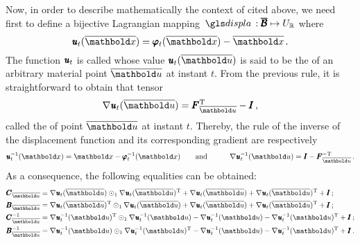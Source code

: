 Now, in order to describe mathematically the context of  cited above, we need first to define a bijective Lagrangian mapping $\map{\gloref{displa}}{\tnr{\overline{\mathcal{B}}}}{U_\real}$ where 
\begin{equation}\label{eq:displac}
 \fua{\tnr{\mathit{u}}_t}{\overline{\vto{x}}}=\fua{\tnr{\varphi}_t}{\overline{\vto{x}}} - \overline{\vto{x}}\,.
 \end{equation} 
 The function $\pmb{\mathit{u}}_t$ is called  whose value $\fua{\tnr{\mathit{u}}_t}{\overline{\vto{u}}}$ is said to be the  of an arbitrary material point $\overline{\vto{u}}$ at instant $t$. From the previous rule, it is straightforward to obtain that tensor       
\begin{equation}\label{eq:gradDispla}
\fua{\nabla\tnr{\mathit{u}}_t}{\overline{\vto{u}}}=\tnr{F}_{\overline{\vto{u}}}^{\text{T}} - \tnr{I}\,,
\end{equation} 
called the  of point $\overline{\vto{u}}$ at instant $t$. Thereby, the rule of the inverse of the displacement function and its corresponding gradient are respectively
\begin{alignat}{3} \label{eq:invDisplace}
\fua{\tnr{\mathit{u}}_t^{-1}}{\vto{x}}=\vto{x}-\fua{\tnr{\varphi}_t^{-1}}{\vto{x}}&\qquad \text{and}\qquad & \fua{\nabla\tnr{\mathit{u}}_t^{-1}}{\vto{u}}=\tnr{I}-\tnr{F}_{\overline{\vto{u}}}^{-\text{T}}\,.
\end{alignat}
As a consequence, the following equalities can be obtained:
\begin{equation}
\begin{aligned} 
\tnr{C}_{\overline{\vto{u}}}&=\fua{\nabla\tnr{\mathit{u}}_t}{\overline{\vto{u}}}\odot_1\fua{\nabla\tnr{\mathit{u}}_t}{\overline{\vto{u}}}^{\text{T}}+\fua{\nabla\tnr{\mathit{u}}_t}{\overline{\vto{u}}}+\fua{\nabla\tnr{\mathit{u}}_t}{\overline{\vto{u}}}^{\text{T}}+\tnr{I}\,;\\
\tnr{B}_{\overline{\vto{u}}}&=\fua{\nabla\tnr{\mathit{u}}_t}{\overline{\vto{u}}}^{\text{T}}\odot_1\fua{\nabla\tnr{\mathit{u}}_t}{\overline{\vto{u}}}+\fua{\nabla\tnr{\mathit{u}}_t}{\overline{\vto{u}}}+\fua{\nabla\tnr{\mathit{u}}_t}{\overline{\vto{u}}}^{\text{T}}+\tnr{I}\,;\\
\tnr{C}_{\overline{\vto{u}}}^{-1}&=\fua{\nabla\tnr{\mathit{u}}_t^{-1}}{\vto{u}}^\text{T}\odot_1\fua{\nabla\tnr{\mathit{u}}_t^{-1}}{\vto{u}}-\fua{\nabla\tnr{\mathit{u}}_t^{-1}}{\vto{u}}-\fua{\nabla\tnr{\mathit{u}}_t^{-1}}{\vto{u}}^{\text{T}}+\tnr{I}\,;\\
\tnr{B}_{\overline{\vto{u}}}^{-1}&=\fua{\nabla\tnr{\mathit{u}}_t^{-1}}{\vto{u}}\odot_1\fua{\nabla\tnr{\mathit{u}}_t^{-1}}{\vto{u}}^\text{T}-\fua{\nabla\tnr{\mathit{u}}_t^{-1}}{\vto{u}}-\fua{\nabla\tnr{\mathit{u}}_t^{-1}}{\vto{u}}^{\text{T}}+\tnr{I}\,.
\end{aligned}
\end{equation}

